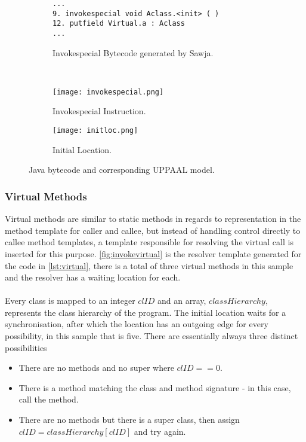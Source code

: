 \begin{figure}[H]
\centering
\begin{subfigure}{\textwidth}
  \begin{lstlisting}
...
9. invokespecial void Aclass.<init> ( )
12. putfield Virtual.a : Aclass
...
  \end{lstlisting}
  \caption{Invokespecial Bytecode generated by Sawja.}
\end{subfigure} \\
\begin{subfigure}{.65\textwidth}
  \texttt{[image: invokespecial.png]}
  \caption{Invokespecial Instruction.}
\end{subfigure}
\hspace{10px}
\begin{subfigure}{.25\textwidth}
  \texttt{[image: initloc.png]}
  \caption{Initial Location.}
\end{subfigure}
\caption{Java bytecode and corresponding UPPAAL model.}
\label{fig:invokespecial}
\end{figure}


\subsubsection{Virtual Methods}
Virtual methods are similar to static methods in regards to representation in the method template for caller and callee, but instead of handling control directly to callee method templates, a template responsible for resolving the virtual call is inserted for this purpose.
\cref{fig:invokevirtual} is the resolver template generated for the code in \cref{lst:virtual}, there is a total of three virtual methods in this sample and the resolver has a waiting location for each.\\\\
Every class is mapped to an integer $clID$ and an array, $classHierarchy$, represents the class hierarchy of the program. The initial location  waits for a synchronisation, after which the location  has an outgoing edge for every possibility, in this sample that is five. There are essentially always three distinct possibilities 

\begin{itemize}
\item There are no methods and no super where $clID == 0$.
\item There is a method matching the class and method signature - in this case, call the method.
\item There are no methods but there is a super class, then assign $clID = classHierarchy[clID]$ and try again.
\end{itemize}

